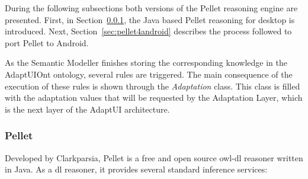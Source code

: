 During the following subsections both versions of the Pellet reasoning engine
are presented. First, in Section~\ref{sec:pellet}, the Java based Pellet reasoning
for desktop is introduced. Next, Section~\ref{sec:pellet4android} describes the
process followed to port Pellet to Android.

As the Semantic Modeller finishes storing the corresponding knowledge in the
AdaptUIOnt ontology, several rules are triggered. The main consequence of the
execution of these rules is shown through the \textit{Adaptation} class. This
class is filled with the adaptation values that will be requested by the
Adaptation Layer, which is the next layer of the AdaptUI architecture.


\subsubsection{Pellet}
\label{sec:pellet}


Developed by Clarkparsia, Pellet is a free and open source \ac{owl}-\ac{dl}
reasoner written in Java. As a \ac{dl} reasoner, it provides several standard 
inference services:

